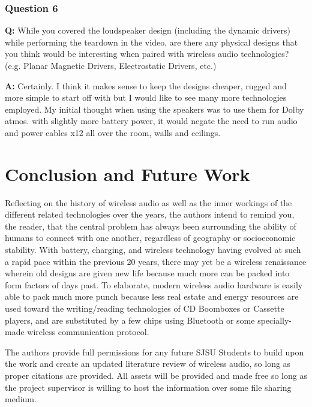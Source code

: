 \documentclass[conference]{IEEEtran}
\begin{document}
\subsubsection*{Question 6}
\textbf{Q:} While you covered the loudspeaker design (including the dynamic drivers) while
performing the teardown in the video, are there any physical designs that you think would be
interesting when paired with wireless audio technologies? (e.g. Planar Magnetic Drivers,
Electrostatic Drivers, etc.)

\textbf{A:} Certainly. I think it makes sense to keep the designs cheaper, rugged and more
simple to start off with but I would like to see many more technologies employed.
My initial thought when using the speakers was to use them for Dolby atmos. with slightly
more battery power, it would negate the need to run audio and power cables x12 all over the
room, walls and ceilings. \cite{wynne_interviewing_2023}

\section*{Conclusion and Future Work}

Reflecting on the history of wireless audio as well as the inner workings of the different
related technologies over the years, the authors intend to remind you, the reader, that the
central problem has always been surrounding the ability of humans to connect with one
another, regardless of geography or socioeconomic stability. With battery, charging, and
wireless technology having evolved at such a rapid pace within the previous 20 years, there
may yet be a wireless renaissance wherein old designs are given new life because much more
can be packed into form factors of days past. To elaborate, modern wireless audio hardware is
easily able to pack much more punch because less real estate and energy resources are used
toward the writing/reading technologies of CD Boomboxes or Cassette players, and are
substituted by a few chips using Bluetooth or some specially-made wireless communication
protocol.

The authors provide full permissions for any future SJSU Students to build upon the work and
create an updated literature review of wireless audio, so long as proper citations are
provided. All assets will be provided and made free so long as the project supervisor is
willing to host the information over some file sharing medium.

\vfill



\vspace{12pt}
\end{document}
